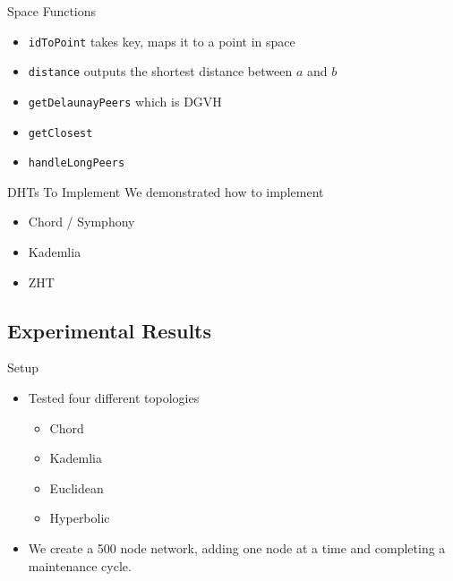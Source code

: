 \documentclass[11pt]{beamer}
\begin{document}
\begin{frame}{Space Functions}
	\begin{itemize}
		\item \texttt{idToPoint}  takes key, maps it to a point in space
		\item \texttt{distance} outputs the shortest distance between $ a $ and $ b $
		\item \texttt{getDelaunayPeers} which is DGVH 
		\item \texttt{getClosest}
		\item \texttt{handleLongPeers}
	\end{itemize}
\end{frame}


\begin{frame}{DHTs To Implement}
	We demonstrated how to implement
	\begin{itemize}
		\item Chord / Symphony
		\item Kademlia 
		\item ZHT
	\end{itemize}
\end{frame}


\subsection{Experimental Results}


\begin{frame}{Setup}
	\begin{itemize}
		\item Tested four different topologies
		\begin{itemize}
			\item Chord
			\item Kademlia
			\item Euclidean
			\item Hyperbolic
		\end{itemize}
		\item We create a 500 node network, adding one node at a time and completing a maintenance cycle.
	\end{itemize}
\end{frame}
\end{document}
